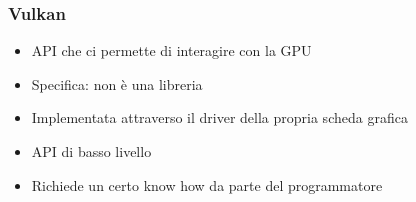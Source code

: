 \begin{frame}
\frametitle{Vulkan}

\begin{itemize}
\item API che ci permette di interagire con la GPU
\item Specifica: non è una libreria
\item Implementata attraverso il driver della propria scheda grafica
\item API di basso livello
\item Richiede un certo know how da parte del programmatore
\end{itemize}

\end{frame}
